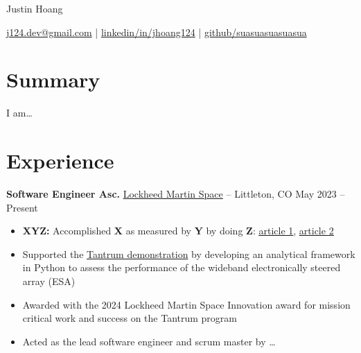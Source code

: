 \documentclass[11pt]{article}       %
\begin{document}
\centerline{\Huge Justin Hoang}

\vspace{5pt}

\centerline{\href{mailto:j124.dev@gmail.com}{j124.dev@gmail.com}
  | \href{https://www.linkedin.com/in/jhoang124/}{linkedin/in/jhoang124}
  | \href{https://github.com/suasuasuasuasua}{github/suasuasuasuasua}}

\vspace{-10pt}

\section*{Summary}
I am\dots

\vspace{-6.5pt}

\section*{Experience}
\textbf{Software Engineer Asc.} \href{https://www.lockheedmartin.com/en-us/capabilities/space.html}{Lockheed Martin Space}
-- Littleton, CO \hfill May 2023 -- Present \\
\vspace{-9pt}
\begin{itemize}
  \item \textbf{XYZ:} Accomplished \textbf{X} as measured by \textbf{Y} by doing \textbf{Z}: \href{https://www.inc.com/bill-murphy-jr/google-recruiters-say-these-5-resume-tips-including-x-y-z-formula-will-improve-your-odds-of-getting-hired-at-google.html}{\underline{article 1}}, \href{https://elevenrecruiting.com/create-an-effective-resume-xyz-resume-format/}{\underline{article 2}}
  \item Supported the \href{https://news.lockheedmartin.com/ESA_payload_demonstrator}{Tantrum demonstration}
        by developing an analytical framework in Python to assess the
        performance of the wideband electronically steered array (ESA)
  \item Awarded with the 2024 Lockheed Martin Space Innovation award for mission
        critical work and success on the Tantrum program
  \item Acted as the lead software engineer and scrum master by \dots
\end{itemize}
\end{document}
